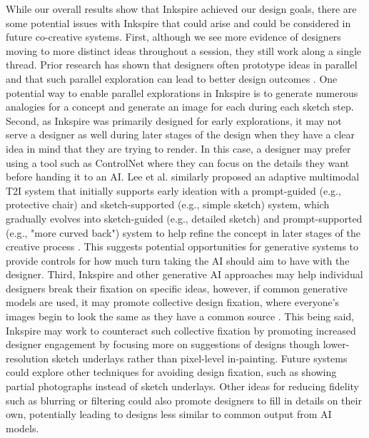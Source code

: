 \documentclass[sigconf, screen]{acmart}
\begin{document}
While our overall results show that Inkspire achieved our design goals, there are some potential issues with Inkspire that could arise and could be considered in future co-creative systems.
First, although we see more evidence of designers moving to more distinct ideas throughout a session, they still work along a single thread.
Prior research has shown that designers often prototype ideas in parallel and that such parallel exploration can lead to better design outcomes \cite{dow2010parallel}.
One potential way to enable parallel explorations in Inkspire is to generate numerous analogies for a concept and generate an image for each during each sketch step.
Second, as Inkspire was primarily designed for early explorations, it may not serve a designer as well during later stages of the design when they have a clear idea in mind that they are trying to render. 
In this case, a designer may prefer using a tool such as ControlNet where they can focus on the details they want before handing it to an AI. Lee et al. similarly proposed an adaptive multimodal T2I system that initially supports early ideation with a prompt-guided (e.g., protective chair) and sketch-supported (e.g., simple sketch) system, which gradually evolves into sketch-guided (e.g., detailed sketch) and prompt-supported (e.g., "more curved back") system to help refine the concept in later stages of the creative process \cite{lee2024the}. This suggests potential opportunities for generative systems to provide controls for how much turn taking the AI should aim to have with the designer.
Third, Inkspire and other generative AI approaches may help individual designers break their fixation on specific ideas, however, if common generative models are used, it may promote collective design fixation, where everyone's images begin to look the same as they have a common source \cite{anderson2024homogenizing}.
This being said, Inkspire may work to counteract such collective fixation by promoting increased designer engagement by focusing more on suggestions of designs though lower-resolution sketch underlays rather than pixel-level in-painting.
Future systems could explore other techniques for avoiding design fixation, such as showing partial photographs \cite{cheng2014new} instead of sketch underlays. 
Other ideas for reducing fidelity such as blurring or filtering could also promote designers to fill in details on their own, potentially leading to designs less similar to common output from AI models.
\end{document}
